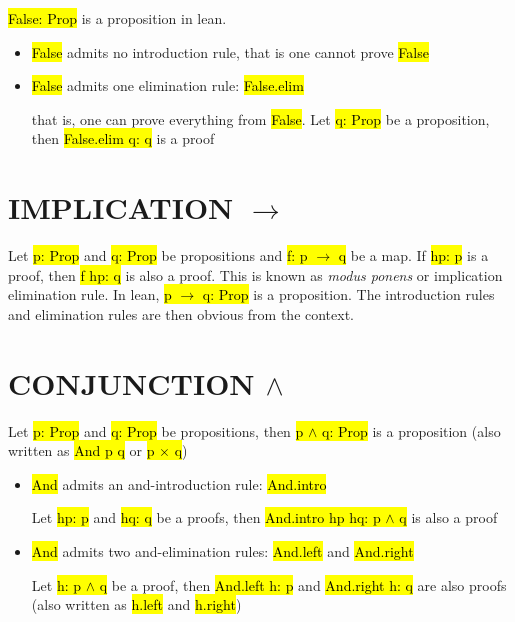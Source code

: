 \hl{False: Prop} is a proposition in lean.

\begin{itemize}
	\item \hl{False} admits no introduction rule, that is one cannot prove \hl{False}
	
	\item \hl{False} admits one elimination rule: \hl{False.elim}
	
	that is, one can prove everything from \hl{False}. Let \hl{q: Prop} be a proposition, then \hl{False.elim q: q} is a proof
\end{itemize}

\section{IMPLICATION $\to$}

Let \hl{p: Prop} and \hl{q: Prop} be propositions and \hl{f: p $\to$ q} be a map. If \hl{hp: p} is a proof, then \hl{f hp: q} is also a proof. This is known as \textit{modus ponens} or implication elimination rule. In lean, \hl{p $\to$ q: Prop} is a proposition. The introduction rules and elimination rules are then obvious from the context.

\section{CONJUNCTION $\land$}

Let \hl{p: Prop} and \hl{q: Prop} be propositions, then \hl{p $\land$ q: Prop} is a proposition (also written as \hl{And p q} or \hl{p $\times$ q})

\begin{itemize}
	\item \hl{And} admits an and-introduction rule: \hl{And.intro}
	
	Let \hl{hp: p} and \hl{hq: q} be a proofs, then \hl{And.intro hp hq: p $\land$ q} is also a proof
	
	\item \hl{And} admits two and-elimination rules: \hl{And.left} and \hl{And.right}
	
	Let \hl{h: p $\land$ q} be a proof, then \hl{And.left h: p} and \hl{And.right h: q} are also proofs (also written as \hl{h.left} and \hl{h.right})
\end{itemize}

\begin{center}
\end{center}


